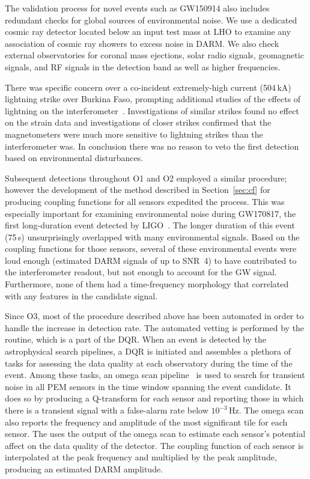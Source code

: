 The validation process for novel events such as GW150914 also includes redundant checks for global sources of environmental noise.
We use a dedicated cosmic ray detector located below an input test mass at \ac{LHO} to examine any association of cosmic ray showers to excess noise in \ac{DARM}.
We also check external observatories for coronal mass ejections, solar radio signals, geomagnetic signals, and \ac{RF} signals in the detection band as well as higher frequencies.

There was specific concern over a co-incident extremely-high current (504\,kA) lightning strike over Burkina Faso, prompting additional studies of the effects of lightning on the interferometer~\citep{Schofield_lightning}.
Investigations of similar strikes found no effect on the strain data and investigations of closer strikes confirmed that the magnetometers were much more sensitive to lightning strikes than the interferometer was.
In conclusion there was no reason to veto the first detection based on environmental disturbances.

Subsequent detections throughout \ac{O1} and \ac{O2} employed a similar procedure; however the development of the method described in Section~\ref{sec:cf} for producing coupling functions for all sensors expedited the process.
This was especially important for examining environmental noise during GW170817, the first long-duration event detected by \ac{LIGO}~\citep{gw170817, Schofield_170817}.
The longer duration of this event (75\,s) unsurprisingly overlapped with many environmental signals.
Based on the coupling functions for those sensors, several of these environmental events were loud enough (estimated \ac{DARM} signals of up to SNR~4) to have contributed to the interferometer readout, but not enough to account for the \ac{GW} signal.
Furthermore, none of them had a time-frequency morphology that correlated with any features in the candidate signal.

Since \ac{O3}, most of the procedure described above has been automated in order to handle the increase in detection rate.
The automated vetting is performed by the  routine, which is a part of the \ac{DQR}.
When an event is detected by the astrophysical search pipelines, a \ac{DQR} is initiated and assembles a plethora of tasks for assessing the data quality at each observatory during the time of the event.
Among these tasks, an omega scan pipeline~\citep{Davis_2021, Chatterji_2004} is used to search for transient noise in all \ac{PEM} sensors in the time window spanning the event candidate.
It does so by producing a Q-transform for each sensor and reporting those in which there is a transient signal with a false-alarm rate below $10^{-3}$\,Hz.
The omega scan also reports the frequency and amplitude of the most significant tile for each sensor.
The  uses the output of the omega scan to estimate each sensor's potential affect on the data quality of the detector.
The coupling function of each sensor is interpolated at the peak frequency and multiplied by the peak amplitude, producing an estimated \ac{DARM} amplitude.

